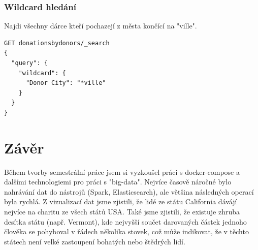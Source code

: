 \documentclass[12pt,a4paper]{article}
\begin{document}
\subsubsection{Wildcard hledání}
Najdi všechny dárce kteří pochazejí z města končící na "ville".
\begin{lstlisting}
GET donationsbydonors/_search
{
  "query": {
    "wildcard": {
      "Donor City": "*ville"
    }
  }
}
\end{lstlisting}


\section{Závěr}
Během tvorby semestrální práce jsem si vyzkoušel práci s docker-compose a dalšími technologiemi pro práci s "big-data". Nejvíce časově náročné bylo nahrávání dat do nástrojů (Spark, Elasticsearch), ale většina následných operací byla rychlá. Z vizualizací dat jsme zjistili, že lidé ze státu California dávájí nejvíce na charitu ze všech států USA. Také jsme zjistili, že existuje zhruba desítka státu (např. Vermont), kde nejvyšší součet darovaných částek jednoho člověka se pohyboval v řádech několika stovek, což může indikovat, že v těchto státech není velké zastoupení bohatých nebo štědrých lidí. 



\printindex

\newpage

\end{document}
